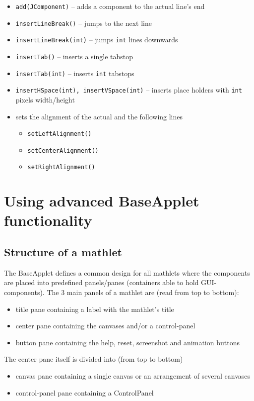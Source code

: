 \documentclass[a4paper,12pt]{book}
\begin{document}
  \begin{itemize}
    \item \verb|add(JComponent)| -- adds a component to the actual line's end
    \item \verb|insertLineBreak()| -- jumps to the next line
    \item \verb|insertLineBreak(int)| -- jumps \verb|int| lines downwards
    \item \verb|insertTab()| -- inserts a single tabstop
    \item \verb|insertTab(int)| -- inserts \verb|int| tabstops
    \item \verb|insertHSpace(int), insertVSpace(int)| -- inserts place holders with \verb|int| pixels width/height
    \item sets the alignment of the actual and the following lines
    \begin{itemize}
      \item \verb|setLeftAlignment()| 
      \item \verb|setCenterAlignment()|
      \item \verb|setRightAlignment()|
    \end{itemize}
  \end{itemize}
  
\section{Using advanced BaseApplet functionality}
  
  \subsection{Structure of a mathlet}
  The BaseApplet defines a common design for all mathlets where the components
  are placed into predefined panels/panes (containers able to hold GUI-components).
  The 3 main panels of a mathlet are (read from top to bottom):
  \begin{itemize}
    \item title pane containing a label with the mathlet's title
    \item center pane containing the canvases and/or a control-panel
    \item button pane containing the help, reset, screenshot and animation buttons
  \end{itemize}
  The center pane itself is divided into (from top to bottom)
  \begin{itemize}
    \item canvas pane containing a single canvas or an arrangement of several canvases
    \item control-panel pane containing a ControlPanel
  \end{itemize}
  
\end{document}
